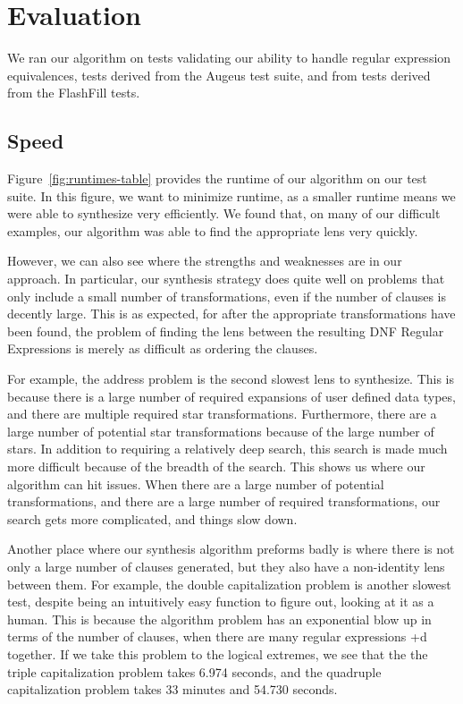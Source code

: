 \section{Evaluation}
We ran our algorithm on tests validating our ability to handle regular
expression equivalences, tests derived from the Augeus test suite, and from
tests derived from the FlashFill tests.


\subsection{Speed}
Figure~\ref{fig:runtimes-table} provides the runtime of our algorithm on our
test suite.
In this figure, we want to minimize runtime, as a smaller runtime means we were
able to synthesize very efficiently.
We found that, on many of our difficult examples, our algorithm was able to find
the appropriate lens very quickly.

However, we can also see where the strengths and weaknesses are in our approach.
In particular, our synthesis strategy does quite well on problems that only
include a small number of transformations, even if the number of clauses is
decently large.
This is as expected, for after the appropriate transformations have been found,
the problem of finding the lens between the resulting DNF Regular Expressions
is merely as difficult as ordering the clauses.

For example, the address problem is the second slowest lens to synthesize.
This is because there is a large number of required expansions of user defined
data types, and there are multiple required star transformations.
Furthermore, there are a large number of potential star transformations because
of the large number of stars.
In addition to requiring a relatively deep search, this search is made much
more difficult because of the breadth of the search.
This shows us where our algorithm can hit issues.
When there are a large number of potential transformations, and there are a
large number of required transformations, our search gets more complicated,
and things slow down.

Another place where our synthesis algorithm preforms badly is where there is not
only a large number of clauses generated, but they also have a non-identity
lens between them.
For example, the double capitalization problem is another slowest test, despite
being an intuitively easy function to figure out, looking at it as a human.
This is because the algorithm problem has an exponential blow up in terms
of the number of clauses, when there are many regular expressions +d together.
If we take this problem to the logical extremes, we see that the the triple
capitalization problem takes 6.974 seconds, and the quadruple capitalization
problem takes 33 minutes and 54.730 seconds.

